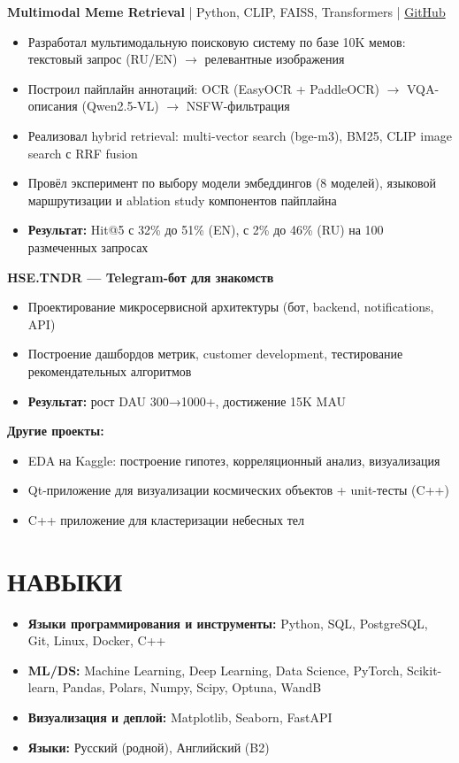 \documentclass[10pt,a4paper]{article}
\begin{document}
\vspace{2pt}
\textbf{Multimodal Meme Retrieval} | Python, CLIP, FAISS, Transformers | \href{https://github.com/Ahamidullin}{GitHub}
\begin{itemize}[left=0pt, itemsep=1pt]
    \item Разработал мультимодальную поисковую систему по базе 10K мемов: текстовый запрос (RU/EN) $\to$ релевантные изображения
    \item Построил пайплайн аннотаций: OCR (EasyOCR + PaddleOCR) $\to$ VQA-описания (Qwen2.5-VL) $\to$ NSFW-фильтрация
    \item Реализовал hybrid retrieval: multi-vector search (bge-m3), BM25, CLIP image search с RRF fusion
    \item Провёл эксперимент по выбору модели эмбеддингов (8 моделей), языковой маршрутизации и ablation study компонентов пайплайна
    \item \textbf{Результат:} Hit@5 с 32\% до 51\% (EN), с 2\% до 46\% (RU) на 100 размеченных запросах
\end{itemize}

\vspace{2pt}
\textbf{HSE.TNDR — Telegram-бот для знакомств}
\begin{itemize}[left=0pt, itemsep=1pt]
    \item Проектирование микросервисной архитектуры (бот, backend, notifications, API)
    \item Построение дашбордов метрик, customer development, тестирование рекомендательных алгоритмов
    \item \textbf{Результат:} рост DAU 300→1000+, достижение 15K MAU
\end{itemize}

\vspace{2pt}
\textbf{Другие проекты:}
\begin{itemize}[left=0pt, itemsep=1pt]
    \item EDA на Kaggle: построение гипотез, корреляционный анализ, визуализация
    \item Qt-приложение для визуализации космических объектов + unit-тесты (C++)
    \item C++ приложение для кластеризации небесных тел
\end{itemize}

\section{НАВЫКИ}
\begin{itemize}[left=0pt, itemsep=1pt]
    \item \textbf{Языки программирования и инструменты:} Python, SQL, PostgreSQL, Git, Linux, Docker, C++
    \item \textbf{ML/DS:} Machine Learning, Deep Learning, Data Science, PyTorch, Scikit-learn, Pandas, Polars, Numpy, Scipy, Optuna, WandB
    \item \textbf{Визуализация и деплой:} Matplotlib, Seaborn, FastAPI
    \item \textbf{Языки:} Русский (родной), Английский (B2)
\end{itemize}
\end{document}
